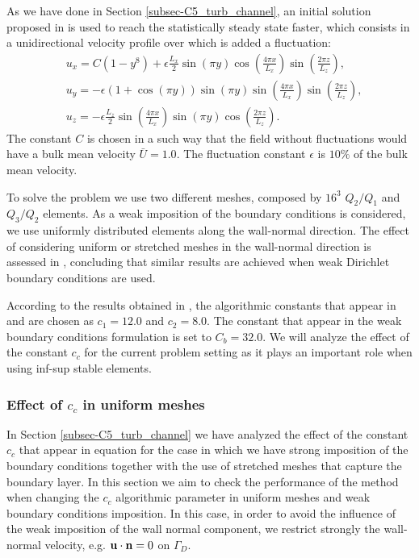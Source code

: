 As we have done in Section \ref{subsec-C5_turb_channel}, an initial solution proposed in \cite{moin_numerical_1980} is used to reach the statistically steady state faster, which consists in a unidirectional velocity profile over which is added a fluctuation:
\begin{align}
\label{eq-C7_TCF_initial_sol}
&u_x = C\left(1-y^8\right)+\epsilon\frac{L_x}{2}\sin(\pi y)\cos\left(\frac{4\pi x}{L_x}\right)\sin\left(\frac{2\pi z}{L_z}\right),\\\nonumber
&u_y = -\epsilon(1+\cos(\pi y))\sin(\pi y)\sin\left(\frac{4\pi x}{L_x}\right)\sin\left(\frac{2\pi z}{L_z}\right),\\
&u_z = -\epsilon\frac{L_z}{2}\sin\left(\frac{4\pi x}{L_x}\right)\sin(\pi y)\cos\left(\frac{2\pi z}{L_z}\right).\nonumber
\end{align}
The constant $C$ is chosen in a such way that the field without fluctuations would have a bulk mean velocity $\bar{U}=1.0$. The fluctuation constant $\epsilon$ is $10\%$ of the bulk mean velocity.

To solve the problem we use two different meshes, composed by $ 16^3 $ $ Q_2/Q_1 $ and $ Q_3/Q_2 $ elements. As a weak imposition of the boundary conditions is considered, we use uniformly distributed elements along the wall-normal direction. The effect of considering uniform or stretched meshes in the wall-normal direction is assessed in \cite{bazilevs_weak_2007}, concluding that similar results are achieved when weak Dirichlet boundary conditions are used.

According to the results obtained in , the algorithmic constants that appear in  and  are chosen as $ c_1=12.0 $ and $ c_2=8.0 $. The constant that appear in the weak boundary conditions formulation is set to $ C_b=32.0 $. We will analyze the effect of the constant $ c_c $ for the current problem setting as it plays an important role when using inf-sup stable elements.
%
\subsubsection{Effect of $ c_c $ in uniform meshes}
In Section \ref{subsec-C5_turb_channel} we have analyzed the effect of the constant $ c_c $ that appear in equation  for the case in which we have strong imposition of the boundary conditions together with the use of stretched meshes that capture the boundary layer. In this section we aim to check the performance of the method when changing the $ c_c $ algorithmic parameter in uniform meshes and weak boundary conditions imposition. In this case, in order to avoid the influence of the weak imposition of the wall normal component, we restrict strongly the wall-normal velocity, e.g. $ {\bf u}\cdot{\bf n}=0 $ on $ \Gamma_D $.

